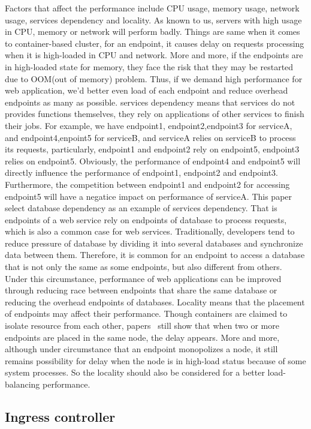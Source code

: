 Factors that affect the performance include CPU usage, memory usage, network usage, services dependency and locality.
As known to us, servers with high usage in CPU, memory or network will perform badly. Things are same when it comes to container-based cluster, for an endpoint, it causes delay on requests processing when it is high-loaded in CPU and network. More and more, if the endpoints are in high-loaded state for memory, they face the risk that they may be restarted due to OOM(out of memory) problem. Thus, if we demand high performance for web application, we'd better even load of each endpoint and reduce overhead endpoints as many as possible.
services dependency means that services do not provides functions themselves, they rely on applications of other services to finish their jobs. For example, we have endpoint1, endpoint2,endpoint3 for serviceA, and endpoint4,enpoint5 for serviceB, and serviceA relies on serviceB to process its requests, particularly, endpoint1 and endpoint2 rely on endpoint5, endpoint3 relies on endpoint5. Obviously, the performance of endpoint4 and endpoint5 will directly influence the performance of endpoint1, endpoint2 and endpoint3. Furthermore, the competition between endpoint1 and endpoint2 for accessing endpoint5 will have a negatice impact on performance of serviceA. This paper select database dependency as an example of services dependency. That is endpoints of a web service rely on endpoints of database to process requests, which is also a common case for web services. Traditionally, developers tend to reduce pressure of database by dividing it into several databases and synchronize data between them. Therefore, it is common for an endpoint to access a database that is not only the same as some endpoints, but also different from others. Under this circumstance, performance of web applications can be improved through reducing race between endpoints that share the same database or reducing the overhead endpoints of databases.
Locality means that the placement of endpoints may affect their performance. Though containers are claimed to isolate resource from each other, papers~{\cite{Zhao2018Locality}} still show that when two or more endpoints are placed in the same node, the delay appears. More and more, although under circumstance that an endpoint monopolizes a node, it still remains possibility for delay when the node is in high-load status because of some system processes. So the locality should also be considered for a better load-balancing performance.

\subsection{Ingress controller}
\label{subsec:ingress_controller}

